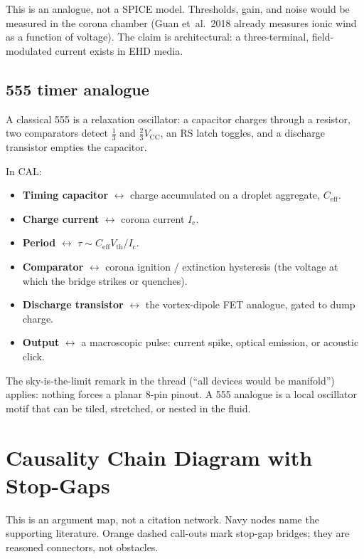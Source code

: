 \documentclass[11pt,a4paper]{article}
\begin{document}
This is an analogue, not a SPICE model. Thresholds, gain, and noise would be measured in the corona chamber (Guan et~al.\ 2018 already measures ionic wind as a function of voltage). The claim is architectural: a three-terminal, field-modulated current exists in EHD media.

\subsection{555 timer analogue}
A classical 555 is a relaxation oscillator: a capacitor charges through a resistor, two comparators detect $\tfrac{1}{3}$ and $\tfrac{2}{3}V_{\mathrm{CC}}$, an RS latch toggles, and a discharge transistor empties the capacitor.

In CAL:

\begin{itemize}[leftmargin=1.4em]
\item \textbf{Timing capacitor} $\leftrightarrow$ charge accumulated on a droplet aggregate, $C_{\mathrm{eff}}$.
\item \textbf{Charge current} $\leftrightarrow$ corona current $I_{\mathrm{c}}$.
\item \textbf{Period} $\leftrightarrow$ $\tau \sim C_{\mathrm{eff}}V_{\mathrm{th}}/I_{\mathrm{c}}$.
\item \textbf{Comparator} $\leftrightarrow$ corona ignition / extinction hysteresis (the voltage at which the bridge strikes or quenches).
\item \textbf{Discharge transistor} $\leftrightarrow$ the vortex-dipole FET analogue, gated to dump charge.
\item \textbf{Output} $\leftrightarrow$ a macroscopic pulse: current spike, optical emission, or acoustic click.
\end{itemize}

The sky-is-the-limit remark in the thread (``all devices would be manifold'') applies: nothing forces a planar 8-pin pinout. A 555 analogue is a local oscillator motif that can be tiled, stretched, or nested in the fluid.

\section{Causality Chain Diagram with Stop-Gaps}
This is an argument map, not a citation network. Navy nodes name the supporting literature. Orange dashed call-outs mark stop-gap bridges; they are reasoned connectors, not obstacles.
\end{document}

